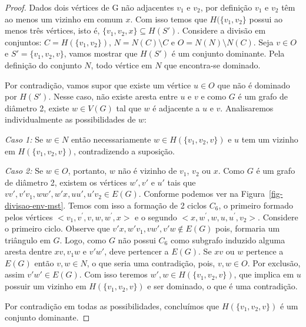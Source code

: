 \begin{proof}
Dados dois vértices de G não adjacentes $v_1$ e $v_2$, por definição $v_1$ e $v_2$ têm ao menos um vizinho em comum $x$. Com isso temos que $H(\{v_1,v_2\}$ possui ao menos três vértices, isto é, $\{v_1, v_2, x\}\subseteq H(S')$. Considere a divisão em conjuntos: $C=H(\{v_1,v_2\})$, $N=N(C)\setminus C$ e $O=N(N)\setminus N(C)$. Seja $v \in O$ e $S'=\{v_1,v_2,v\}$, vamos mostrar que $H(S')$ é um conjunto dominante.
Pela definição do conjunto $N$, todo vértice em $N$ que encontra-se dominado.

Por contradição, vamos supor que existe um vértice $u \in O$ que não é dominado por $H(S')$. Nesse caso, não existe aresta entre $u$ e $v$ e como $G$ é um grafo de diâmetro 2, existe $w\in V(G)$ tal que $w$ é adjacente a $u$ e $v$. Analisaremos individualmente as possibilidades de $w$:

{\it Caso 1:} Se $w \in N$ então necessariamente $w \in H(\{v_1,v_2,v\})$ e $u$ tem um vizinho em $H(\{v_1,v_2,v\})$, contradizendo a suposição.
    
{\it Caso 2:} Se $w \in O$, portanto, $w$ não é vizinho de $v_1$, $v_2$ ou $x$. Como $G$ é um grafo de diâmetro 2, existem os vértices $w', v'$ e $u'$ tais que $vv', v'v_1, ww', w'x, uu', u'v_2 \in E(G)$. Conforme podemos ver na Figura~\ref{fig-divisao-env-mst}. Temos com isso a formação de 2 ciclos $C_6$, o primeiro formado pelos vértices  $<v_1,v^\prime,v,w,w^\prime,x>$ e o segundo $<x,w^\prime,w,u,u^\prime,v_2>$. Considere o primeiro ciclo. Observe que $v'x,w'v_1,vw',v'w \notin E(G)$ pois, formaria um triângulo em $G$. Logo, como $G$ não possui $C_6$ como subgrafo induzido alguma aresta dentre $xv, v_1w$ e $v'w'$, deve pertencer a $E(G)$. Se $xv$ ou $w$ pertence a $E(G)$ então $v,w \in N$, o que seria uma contradição, pois, $v,w \in O$. Por exclusão, assim  $v'w'\in E(G)$. Com isso teremos $w',w\in H(\{v_1,v_2,v\})$, que implica em $u$ possuir um vizinho em $H(\{v_1,v_2,v\})$ e ser dominado, o que é uma contradição.

Por contradição em todas as possibilidades, concluímos que $H(\{v_1,v_2,v\})$ é um conjunto dominante. 
\end{proof}


